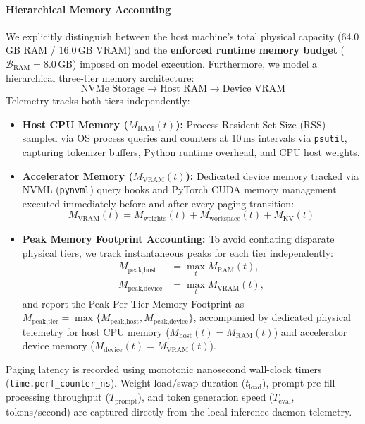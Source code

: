 \paragraph{Hierarchical Memory Accounting}
We explicitly distinguish between the host machine's total physical capacity (64.0\,GB RAM / 16.0\,GB VRAM) and the \textbf{enforced runtime memory budget} ($\mathcal{B}_{\text{RAM}} = 8.0$\,GB) imposed on model execution. Furthermore, we model a hierarchical three-tier memory architecture:
\begin{equation}
\text{NVMe Storage} \longrightarrow \text{Host RAM} \longrightarrow \text{Device VRAM}
\end{equation}
Telemetry tracks both tiers independently:
\begin{itemize}
    \item \textbf{Host CPU Memory ($M_{\text{RAM}}(t)$):} Process Resident Set Size (RSS) sampled via OS process queries and counters at 10\,ms intervals via \texttt{psutil}, capturing tokenizer buffers, Python runtime overhead, and CPU host weights.
    \item \textbf{Accelerator Memory ($M_{\text{VRAM}}(t)$):} Dedicated device memory tracked via NVML (\texttt{pynvml}) query hooks and PyTorch CUDA memory management executed immediately before and after every paging transition:
    \begin{equation}
    M_{\text{VRAM}}(t) = M_{\text{weights}}(t) + M_{\text{workspace}}(t) + M_{\text{KV}}(t)
    \end{equation}
    \item \textbf{Peak Memory Footprint Accounting:} To avoid conflating disparate physical tiers, we track instantaneous peaks for each tier independently:
    \begin{align}
    M_{\text{peak,host}} &= \max_t M_{\text{RAM}}(t), \\
    M_{\text{peak,device}} &= \max_t M_{\text{VRAM}}(t),
    \end{align}
    and report the Peak Per-Tier Memory Footprint as $M_{\text{peak,tier}} = \max \{ M_{\text{peak,host}}, M_{\text{peak,device}} \}$, accompanied by dedicated physical telemetry for host CPU memory ($M_{\text{host}}(t) = M_{\text{RAM}}(t)$) and accelerator device memory ($M_{\text{device}}(t) = M_{\text{VRAM}}(t)$).
\end{itemize}
Paging latency is recorded using monotonic nanosecond wall-clock timers (\texttt{time.perf\_counter\_ns}). Weight load/swap duration ($t_{\text{load}}$), prompt pre-fill processing throughput ($T_{\text{prompt}}$), and token generation speed ($T_{\text{eval}}$, tokens/second) are captured directly from the local inference daemon telemetry.

